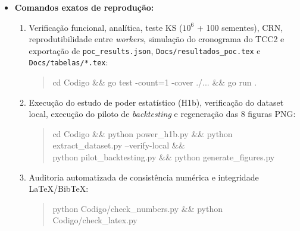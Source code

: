 \documentclass[12pt,openany,oneside,a4paper,english,brazilian,sumario=tradicional]{abntex2}
\begin{document}
\begin{apendicesenv}
\begin{itemize}
\begin{itemize}
    \item \texttt{Codigo/power\_h1b.py} e \texttt{Codigo/}\allowbreak\texttt{power\_h1b\_results.json}: cálculo binomial exato do poder estatístico do teste de equivalência TOST ($\alpha=0{,}05$, IC de Wilson a 90\%) para a hipótese H1b;
    \item \texttt{Codigo/generate\_figures.py} e \texttt{Docs/figuras/}: gerador reprodutível das 8 imagens PNG RGB opacas em 200 DPI referenciadas em \texttt{Docs/Main.tex} (lendo diretamente os vetores empíricos de \texttt{Codigo/}\allowbreak\texttt{poc\_results.json});
    \item \texttt{Codigo/check\_latex.py} e \texttt{Codigo/check\_numbers.py}: \textit{scripts} automatizados de auditoria que verificam a ausência de \textit{warnings} de referências/\allowbreak citações, posicionamento seguro dos fragmentos de tabela e a sincronia numérica exata entre \texttt{poc\_results.json}, \texttt{dataset\_backtesting.json} e o texto LaTeX.
  \end{itemize}
  \item \textbf{Comandos exatos de reprodução:}
  \begin{enumerate}
    \item Verificação funcional, analítica, teste KS ($10^6$ + 100 sementes), CRN, reprodutibilidade entre \textit{workers}, simulação do cronograma do TCC2 e exportação de \texttt{poc\_results.json}, \texttt{Docs/resultados\_poc.tex} e \texttt{Docs/tabelas/*.tex}:
    \begin{quote}\small\raggedright\ttfamily
    cd Codigo \&\& go test -count=1 -cover ./... \&\& go run .
    \end{quote}
    \item Execução do estudo de poder estatístico (H1b), verificação do dataset local, execução do piloto de \textit{backtesting} e regeneração das 8 figuras PNG:
    \begin{quote}\small\raggedright\ttfamily
    cd Codigo \&\& python power\_h1b.py \&\& python extract\_dataset.py --verify-local \&\&\\
    python pilot\_backtesting.py \&\& python generate\_figures.py
    \end{quote}
    \item Auditoria automatizada de consistência numérica e integridade LaTeX/BibTeX:
    \begin{quote}\small\raggedright\ttfamily
    python Codigo/check\_numbers.py \&\& python Codigo/check\_latex.py
    \end{quote}
  \end{enumerate}
\end{itemize}

\end{apendicesenv}
\end{document}
